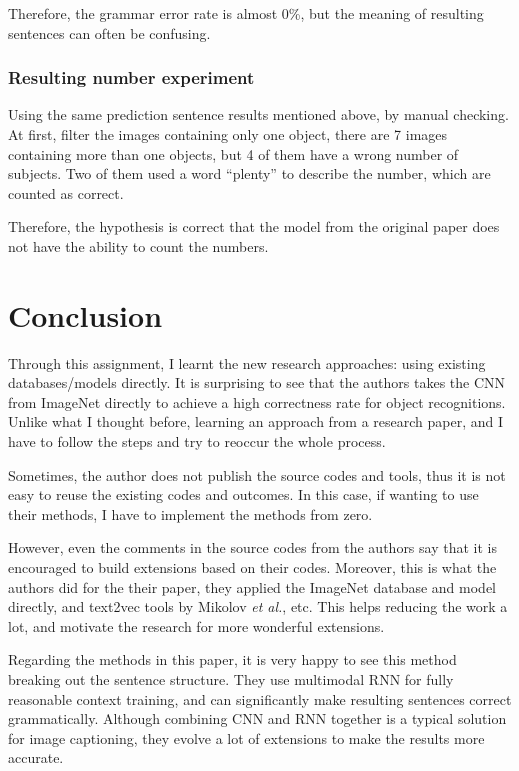 \documentclass[10pt,twocolumn,letterpaper]{article}
\begin{document}
Therefore, the grammar error rate is almost 0\%, but the meaning of resulting sentences can often be confusing.


\subsubsection{Resulting number experiment} \label{sec:rn}
Using the same prediction sentence results mentioned above, by manual checking.
At first, filter the images containing only one object, there are 7 images containing more than one objects,
but 4 of them have a wrong number of subjects. Two of them used a word ``plenty'' to describe the number, which are counted as correct.

Therefore, the hypothesis is correct that the model from the original paper does not have the ability to count the numbers.


\section{Conclusion}
Through this assignment, I learnt the new research approaches: using existing databases/models directly.
It is surprising to see that the authors takes the CNN from ImageNet directly
to achieve a high correctness rate for object recognitions.
Unlike what I thought before, learning an approach from a research paper,
and I have to follow the steps and try to reoccur the whole process.

Sometimes, the author does not publish the source codes and tools,
thus it is not easy to reuse the existing codes and outcomes.
In this case, if wanting to use their methods, I have to implement the methods from zero.

However, even the comments in the source codes from the authors say that it is encouraged to build extensions based on their codes.
Moreover, this is what the authors did for the their paper, they applied the ImageNet database and model directly,
and text2vec tools by Mikolov \textit{et al.}, etc.
This helps reducing the work a lot, and motivate the research for more wonderful extensions.

Regarding the methods in this paper, it is very happy to see this method breaking out the sentence structure.
They use multimodal RNN for fully reasonable context training,
and can significantly make resulting sentences correct grammatically.
Although combining CNN and RNN together is a typical solution for image captioning,
they evolve a lot of extensions to make the results more accurate.
\end{document}
